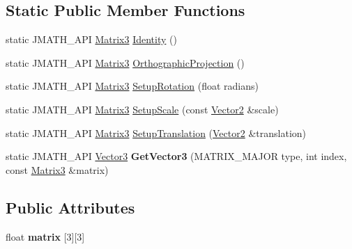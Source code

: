 \subsection*{Static Public Member Functions}
\begin{DoxyCompactItemize}
\item 
static J\+M\+A\+T\+H\+\_\+\+A\+P\+I \hyperlink{class_matrix3}{Matrix3} \hyperlink{class_matrix3_a0f35256afb914b66813f340fc3b5478c}{Identity} ()
\item 
static J\+M\+A\+T\+H\+\_\+\+A\+P\+I \hyperlink{class_matrix3}{Matrix3} \hyperlink{class_matrix3_ab6284cde560d36bf21e988ca0a625245}{Orthographic\+Projection} ()
\item 
static J\+M\+A\+T\+H\+\_\+\+A\+P\+I \hyperlink{class_matrix3}{Matrix3} \hyperlink{class_matrix3_a94e471d8f4dbb2368912988a8fd32340}{Setup\+Rotation} (float radians)
\item 
static J\+M\+A\+T\+H\+\_\+\+A\+P\+I \hyperlink{class_matrix3}{Matrix3} \hyperlink{class_matrix3_a5e61a8ed4981c3e49ebde0bfd77916ac}{Setup\+Scale} (const \hyperlink{class_vector2}{Vector2} \&scale)
\item 
static J\+M\+A\+T\+H\+\_\+\+A\+P\+I \hyperlink{class_matrix3}{Matrix3} \hyperlink{class_matrix3_a05d5993920c793a9ce9fc0d1b6d5cd94}{Setup\+Translation} (\hyperlink{class_vector2}{Vector2} \&translation)
\item 
\hypertarget{class_matrix3_a0f66ddf93834a9fef4e71fe4187bd801}{static J\+M\+A\+T\+H\+\_\+\+A\+P\+I \hyperlink{class_vector3}{Vector3} {\bfseries Get\+Vector3} (M\+A\+T\+R\+I\+X\+\_\+\+M\+A\+J\+O\+R type, int index, const \hyperlink{class_matrix3}{Matrix3} \&matrix)}\label{class_matrix3_a0f66ddf93834a9fef4e71fe4187bd801}

\end{DoxyCompactItemize}
\subsection*{Public Attributes}
\begin{DoxyCompactItemize}
\item 
\hypertarget{class_matrix3_a14d8061428cef9b36bba0aba016b2490}{float {\bfseries matrix} \mbox{[}3\mbox{]}\mbox{[}3\mbox{]}}\label{class_matrix3_a14d8061428cef9b36bba0aba016b2490}

\end{DoxyCompactItemize}
